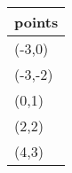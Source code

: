 {
    \begin{minipage}{0.49\textwidth}
        \centering
        \ttfamily
        \begin{tabular}{l}
            points \\
            \hline
            (-3,\phantom{-}0) \\
            (-3,-2) \\
            (\phantom{-}0,\phantom{-}1) \\
            (\phantom{-}2,\phantom{-}2) \\
            (\phantom{-}4,\phantom{-}3) \\
        \end{tabular}
    \end{minipage}
    \hfil 
    \begin{minipage}{0.49\textwidth}
    \end{minipage}
}
